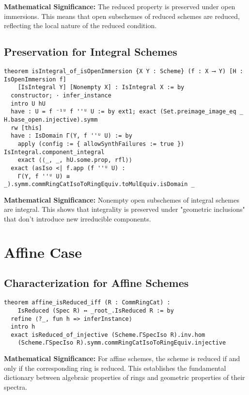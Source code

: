 \documentclass{article}
\theoremstyle{definition}
\begin{document}
\textbf{Mathematical Significance:} The reduced property is preserved under open immersions. This means that open subschemes of reduced schemes are reduced, reflecting the local nature of the reduced condition.

\subsection{Preservation for Integral Schemes}

\begin{lstlisting}
theorem isIntegral_of_isOpenImmersion {X Y : Scheme} (f : X ⟶ Y) [H : IsOpenImmersion f]
    [IsIntegral Y] [Nonempty X] : IsIntegral X := by
  constructor; · infer_instance
  intro U hU
  have : U = f ⁻¹ᵁ f ''ᵁ U := by ext1; exact (Set.preimage_image_eq _ H.base_open.injective).symm
  rw [this]
  have : IsDomain Γ(Y, f ''ᵁ U) := by
    apply (config := { allowSynthFailures := true }) IsIntegral.component_integral
    exact ⟨⟨_, _, hU.some.prop, rfl⟩⟩
  exact (asIso <| f.app (f ''ᵁ U) :
    Γ(Y, f ''ᵁ U) ≅ _).symm.commRingCatIsoToRingEquiv.toMulEquiv.isDomain _
\end{lstlisting}

\textbf{Mathematical Significance:} Nonempty open subschemes of integral schemes are integral. This shows that integrality is preserved under "geometric inclusions" that don't introduce new irreducible components.

\section{Affine Case}

\subsection{Characterization for Affine Schemes}

\begin{lstlisting}
theorem affine_isReduced_iff (R : CommRingCat) :
    IsReduced (Spec R) ↔ _root_.IsReduced R := by
  refine ⟨?_, fun h => inferInstance⟩
  intro h
  exact isReduced_of_injective (Scheme.ΓSpecIso R).inv.hom
    (Scheme.ΓSpecIso R).symm.commRingCatIsoToRingEquiv.injective
\end{lstlisting}

\textbf{Mathematical Significance:} For affine schemes, the scheme is reduced if and only if the corresponding ring is reduced. This establishes the fundamental dictionary between algebraic properties of rings and geometric properties of their spectra.
\end{document}

